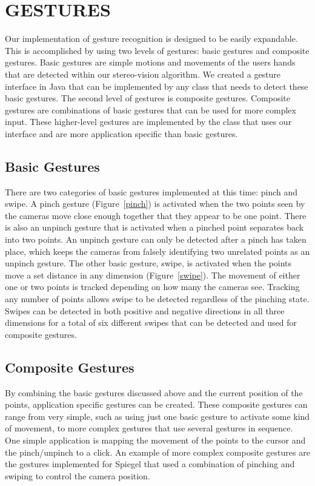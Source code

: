 \documentclass[a4paper,twoside]{article}
\begin{document}
\section{\uppercase{Gestures}}
Our implementation of gesture recognition is designed to be easily expandable. This is accomplished by using two levels of gestures: basic gestures and composite gestures. Basic gestures are simple motions and movements of the users hands that are detected within our stereo-vision algorithm. We created a gesture interface in Java that can be implemented by any class that needs to detect these basic gestures. The second level of gestures is composite gestures. Composite gestures are combinations of basic gestures that can be used for more complex input. These higher-level gestures are implemented by the class that uses our interface and are more application specific than basic gestures. 
\subsection{Basic Gestures}
There are two categories of basic gestures implemented at this time: pinch and swipe. A pinch gesture (Figure~\ref{pinch}) is activated when the two points seen by the cameras move close enough together that they appear to be one point. There is also an unpinch gesture that is activated when a pinched point separates back into two points. An unpinch gesture can only be detected after a pinch has taken place, which keeps the cameras from falsely identifying two unrelated points as an unpinch gesture. The other basic gesture, swipe, is activated when the points move a set distance in any dimension (Figure~\ref{swipe}). The movement of either one or two points is tracked depending on how many the cameras see. Tracking any number of points allows swipe to be detected regardless of the pinching state. Swipes can be detected in both positive and negative directions in all three dimensions for a total of six different swipes that can be detected and used for composite gestures.

\subsection{Composite Gestures}
By combining the basic gestures discussed above and the current position of the points, application specific gestures can be created. These composite gestures can range from very simple, such as using just one basic gesture to activate some kind of movement, to more complex gestures that use several gestures in sequence. One simple application is mapping the movement of the points to the cursor and the pinch/unpinch to a click. An example of more complex composite gestures are the gestures implemented for Spiegel that used a combination of pinching and swiping to control the camera position. 
\end{document}
